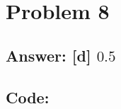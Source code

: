 \documentclass[11pt]{article}
\begin{document}
    \begin{center}
    \end{center}
    { \hspace*{\fill} \\}
    
    \hypertarget{problem-8}{%
\section{Problem 8}\label{problem-8}}

\hypertarget{answer-d-0.5}{%
\subsection{\texorpdfstring{Answer: {[}d{]}
\(0.5\)}{Answer: {[}d{]} 0.5}}\label{answer-d-0.5}}

\hypertarget{code}{%
\subsection{Code:}\label{code}}
\end{document}
